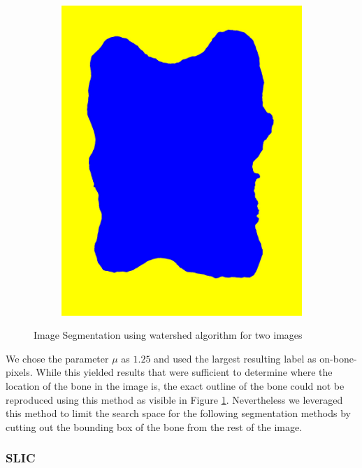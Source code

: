 \documentclass[pdftex,12pt,a4paper]{report}
\begin{document}
\begin{figure}[h]
\begin{subfigure}[b]{0.24\textwidth}
		\subcaption*{}
	\end{subfigure}
	\begin{subfigure}[b]{0.24\textwidth}
		\centering
		\includegraphics[width=.9\linewidth]{img/segmentation/bad/watershed/segmented.jpg}
		\subcaption{}
	\end{subfigure}
	\caption{Image Segmentation using watershed algorithm for two images}
	\label{fig:watershed}
\end{figure}

We chose the parameter $\mu$ as $1.25$ and used the largest resulting label as on-bone-pixels. While this yielded results that were sufficient to determine where the  location of the bone in the image is, the exact outline of the bone could not be reproduced using this method as visible in Figure \ref{fig:watershed}. Nevertheless we leveraged this method to limit the search space for the following segmentation methods by cutting out the bounding box of the bone from the rest of the image.

\subsubsection{SLIC}
\end{document}
